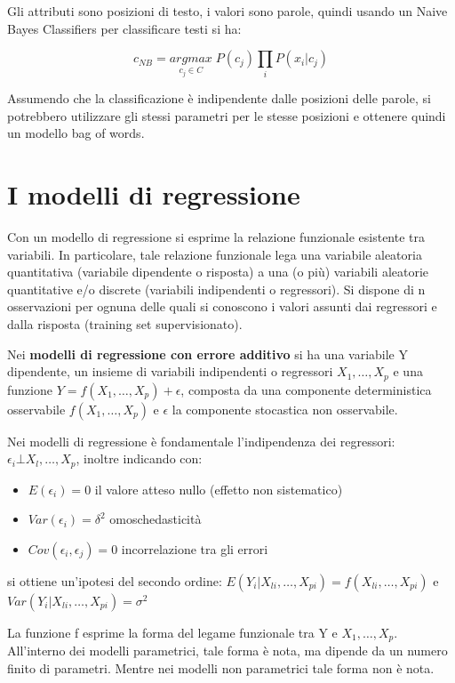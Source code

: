 \documentclass[a4paper]{extarticle}
\begin{document}
Gli attributi sono posizioni di testo, i valori sono parole, quindi usando un Naive Bayes Classifiers per classificare testi si ha:

\begin{equation*}
c_{NB} =  \underset{c_j\in C}{argmax} \; P(c_j) \prod_i P(x_i|c_j)
\end{equation*}

Assumendo che la classificazione è indipendente dalle posizioni delle parole, si potrebbero utilizzare gli stessi parametri per le stesse posizioni e ottenere quindi un modello bag of words.

\newpage

\section{I modelli di regressione}

Con un modello di regressione si esprime la relazione funzionale esistente tra variabili.
In particolare, tale relazione funzionale lega una variabile aleatoria quantitativa (variabile dipendente o risposta) a una (o più) variabili aleatorie quantitative e/o discrete (variabili indipendenti o regressori). Si dispone di n osservazioni per ognuna delle quali si conoscono i valori assunti dai regressori e dalla risposta (training set supervisionato).

Nei \textbf{modelli di regressione con errore additivo} si ha una variabile Y dipendente, un insieme di variabili indipendenti o regressori $X_1,\dots,X_p$ e una funzione $Y = f(X_1,\dots,X_p)+\epsilon$, composta da una componente deterministica osservabile $f(X_1,\dots,X_p)$ e $\epsilon$ la componente stocastica non osservabile. 

Nei modelli di regressione è fondamentale l'indipendenza dei regressori: $\epsilon_i \bot X_l,\dots,X_p$, inoltre indicando con:
\begin{itemize}
\item $E(\epsilon_i) = 0$ il valore atteso nullo (effetto non sistematico)
\item $Var(\epsilon_i) = \delta^2$ omoschedasticità
\item $Cov(\epsilon_i,\epsilon_j)=0$ incorrelazione tra gli errori
\end{itemize}

si ottiene un'ipotesi del secondo ordine: $E(Y_i | X_{li}, \dots, X_{pi}) = f(X_{li},\dots,X_{pi})$ e $Var(Y_i |  X_{li}, \dots, X_{pi}) = \sigma^2$

La funzione f esprime la forma del legame funzionale tra Y e $X_1,\dots,X_p$. All'interno dei modelli parametrici, tale forma è nota, ma dipende da un numero finito di parametri. Mentre nei modelli non parametrici tale forma non è nota.
\end{document}

